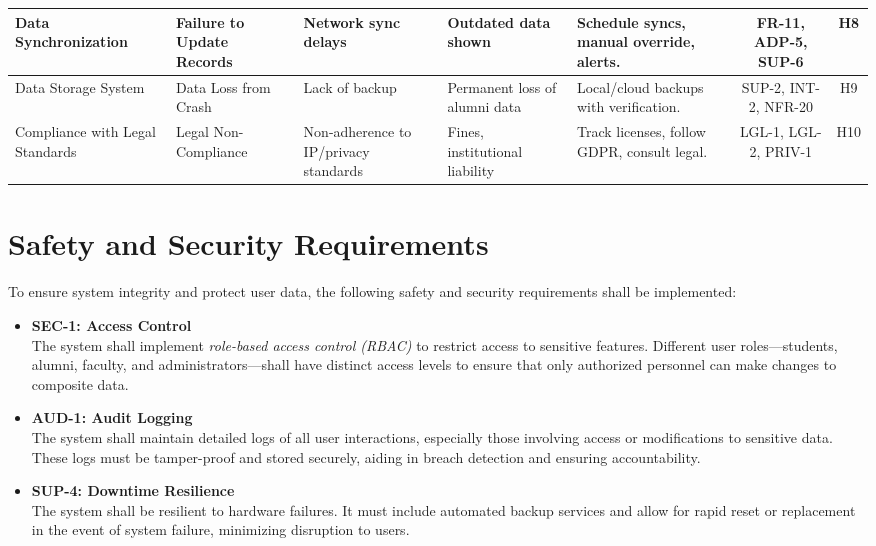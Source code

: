 \documentclass{article}
\begin{document}
\begin{landscape}
\begin{table}[H]
\begin{adjustbox}{max width=\linewidth}
\begin{tabular}{|p{4cm}|p{3.8cm}|p{4cm}|p{4cm}|p{6cm}|c|c|}
\hline
Data Synchronization & Failure to Update Records & Network sync delays & Outdated data shown & Schedule syncs, manual override, alerts. & FR-11, ADP-5, SUP-6 & H8 \\
\hline
Data Storage System & Data Loss from Crash & Lack of backup & Permanent loss of alumni data & Local/cloud backups with verification. & SUP-2, INT-2, NFR-20 & H9 \\
\hline
Compliance with Legal Standards & Legal Non-Compliance & Non-adherence to IP/privacy standards & Fines, institutional liability & Track licenses, follow GDPR, consult legal. & LGL-1, LGL-2, PRIV-1 & H10 \\
\hline
\end{tabular}
\end{adjustbox}
\end{table}
\end{landscape}
\restoregeometry



\section{Safety and Security Requirements}

To ensure system integrity and protect user data, the following safety and security requirements shall be implemented:

\begin{itemize}
  \item \textbf{SEC-1: Access Control} \\
  The system shall implement \textit{role-based access control (RBAC)} to restrict access to sensitive features. Different user roles—students, alumni, faculty, and administrators—shall have distinct access levels to ensure that only authorized personnel can make changes to composite data.

  \item \textbf{AUD-1: Audit Logging} \\
  The system shall maintain detailed logs of all user interactions, especially those involving access or modifications to sensitive data. These logs must be tamper-proof and stored securely, aiding in breach detection and ensuring accountability.

  \item \textbf{SUP-4: Downtime Resilience} \\
  The system shall be resilient to hardware failures. It must include automated backup services and allow for rapid reset or replacement in the event of system failure, minimizing disruption to users.
\end{itemize}
\end{document}

